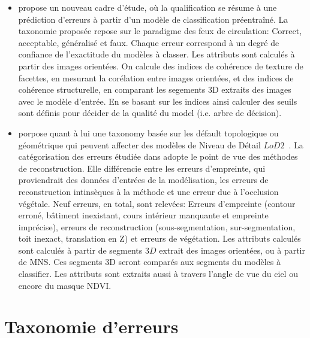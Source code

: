 \documentclass[a4paper,french]{article}
\begin{document}
    \begin{itemize}
        \item \cite{Boudet2006} propose un nouveau cadre d'étude, où la qualification se résume à une prédiction d'erreurs à partir d'un modèle de classification préentraîné. La taxonomie proposée repose sur le paradigme des feux de circulation: Correct, acceptable, généralisé et faux. Chaque erreur correspond à un degré de confiance de l'exactitude du modèles à classer. Les attributs sont calculés à partir des images orientées. On calcule des indices de cohérence de texture de facettes, en mesurant la corélation entre images orientées, et des indices de cohérence structurelle, en comparant les segements 3D extraits des images avec le modèle d'entrée. En se basant sur les indices ainsi calculer des seuils sont définis pour décider de la qualité du model (i.e. arbre de décision).
        \item \cite{Michelin2013} porpose quant à lui une taxonomy basée sur les défault topologique ou géométrique qui peuvent affecter des modèles de Niveau de Détail $LoD2$~\cite{kolbe2005citygml}. La catégorisation des erreurs étudiée dans \cite{Michelin2013} adopte le point de vue des méthodes de reconstruction. Elle différencie entre les erreurs d'empreinte, qui proviendrait des données d'entrées de la modélisation, les erreurs de reconstruction intinsèques à la méthode et une erreur due à l'occlusion végétale. Neuf erreurs, en total, sont relevées: Erreurs d'empreinte (contour erroné, bâtiment inexistant, cours intérieur manquante et empreinte imprécise), erreurs de reconstruction (sous-segmentation, sur-segmentation, toit inexact, translation en Z) et erreurs de végétation. Les attributs calculés sont calculés à partir de segments $3D$ extrait des images orientées, ou à partir de MNS. Ces segments 3D seront comparés aux segments du modèles à classifier. Les attributs sont extraits aussi à travers l'angle de vue du ciel ou encore du masque NDVI.
    \end{itemize}

    \section{Taxonomie d'erreurs}
\end{document}
